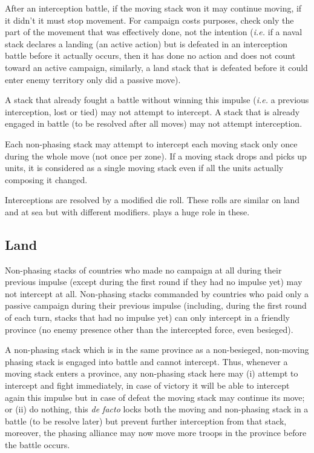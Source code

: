 After an interception battle, if the moving stack won it may continue moving,
if it didn't it must stop movement. For campaign costs purposes, check only
the part of the movement that was effectively done, not the intention
(\emph{i.e.}  if a naval stack declares a landing (an active action) but is
defeated in an interception battle before it actually occurs, then it has done
no action and does not count toward an active campaign, similarly, a land
stack that is defeated before it could enter enemy territory only did a
passive move).

A stack that already fought a battle without winning this impulse (\emph{i.e.}
a previous interception, lost or tied) may not attempt to intercept. A stack
that is already engaged in battle (to be resolved after all moves) may not
attempt interception.

Each non-phasing stack may attempt to intercept each moving stack only once
during the whole move (not once per zone). If a moving stack drops and picks
up units, it is considered as a single moving stack even if all the units
actually composing it changed.

Interceptions are resolved by a modified die roll. These rolls are similar on
land and at sea but with different modifiers. \Man plays a huge role in these.

\subsection{Land}
Non-phasing stacks of countries who made no campaign at all during their
previous impulse (except during the first round if they had no impulse yet)
may not intercept at all. Non-phasing stacks commanded by countries who paid
only a passive campaign during their previous impulse (including, during the
first round of each turn, stacks that had no impulse yet) can only intercept
in a friendly province (no enemy presence other than the intercepted force,
even besieged).

A non-phasing stack which is in the same province as a non-besieged,
non-moving phasing stack is engaged into battle and cannot intercept. Thus,
whenever a moving stack enters a province, any non-phasing stack here may (i)
attempt to intercept and fight immediately, in case of victory it will be able
to intercept again this impulse but in case of defeat the moving stack may
continue its move; or (ii) do nothing, this \emph{de facto} locks both the
moving and non-phasing stack in a battle (to be resolve later) but prevent
further interception from that stack, moreover, the phasing alliance may now
move more troops in the province before the battle occurs.

